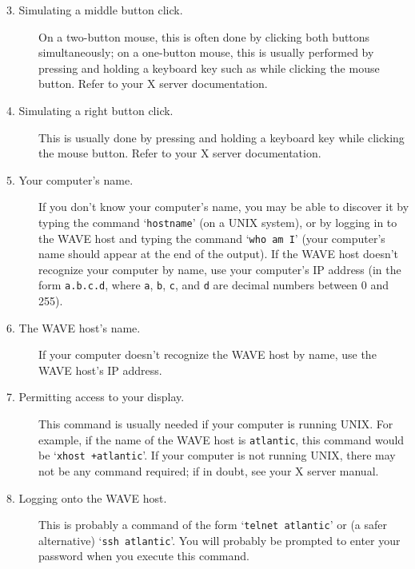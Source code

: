 \documentclass[twoside]{book}
\newcommand{\keycap}[1]{\cornersize{.5}\Ovalbox{\small\sf #1}}
\newcommand{\WAVE}{{\sf WAVE}\xspace}
\begin{document}
\begin{description}
\item[3. Simulating a middle button click.]
On a two-button mouse, this is often done by clicking both buttons
simultaneously; on a one-button mouse, this is usually performed by
pressing and holding a keyboard key such as \keycap{Shift}
while clicking the mouse button.  Refer to your X server
documentation.

\item[4. Simulating a right button click.]
This is usually done by pressing and holding a keyboard key while
clicking the mouse button.  Refer to your X server documentation.

\item[5. Your computer's name.]
If you don't know your computer's name, you may be able to discover
it by typing the command `{\tt hostname}' (on a UNIX system), or by
logging in to the \WAVE{} host
\index{WAVE host@\WAVE{} host}
and typing the command `{\tt who am I}'
(your computer's name should appear at the end of the output).  If the
\WAVE{} host doesn't recognize your computer by name, use
your computer's IP address
(in the form {\tt a.b.c.d}, where {\tt a},
{\tt b}, {\tt c}, and {\tt d} are decimal numbers between 0 and 255).

\item[6. The \WAVE{} host's name.]
If your computer doesn't recognize the \WAVE{} host by name, use
the \WAVE{} host's IP address.

\item[7. Permitting access to your display.]
This command is usually needed if your computer is running UNIX.
For example, if the name of the \WAVE{} host is {\tt atlantic}, this
command would be `{\tt xhost +atlantic}'.
If your computer is not running
UNIX, there may not be any command required;  if in doubt, see your X server
manual.

\item[8. Logging onto the \WAVE{} host.]
This is probably a command of the form `{\tt telnet atlantic}' or (a safer
alternative) `{\tt ssh atlantic}'.
You will
probably be prompted to enter your password when you execute this command.


\end{description}
\end{document}
